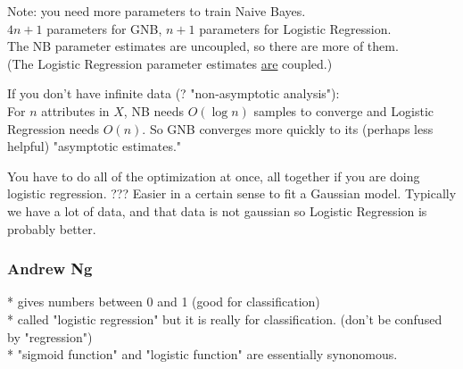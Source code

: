  Note: you need more parameters to train Naive Bayes. \hfill \\
 $4n + 1$ parameters for GNB,  $n + 1$ parameters for Logistic Regression. \hfill \\
 The NB parameter estimates are uncoupled, so there are more of them.   \hfill \\
 (The Logistic Regression parameter estimates \underline{are} coupled.)

If you don't have infinite data (? "non-asymptotic analysis"): \hfill \\
For $n$ attributes in $X$, NB needs $O(\log n)$ samples to converge and Logistic Regression needs $O(n)$.  
So GNB converges more quickly to its (perhaps less helpful) "asymptotic estimates."

You have to do all of the optimization at once, all together if you are doing logistic regression.  ???
Easier in a certain sense to fit a Gaussian model. 
Typically we have a lot of data, and that data is not gaussian so Logistic Regression is probably better. 

\subsubsection{Andrew Ng}
* gives numbers between 0 and 1 (good for classification)   \hfill \\
* called "logistic regression" but it is really for classification.  (don't be confused by "regression") \hfill \\
* "sigmoid function" and "logistic function" are essentially synonomous.  \hfill \\
 
